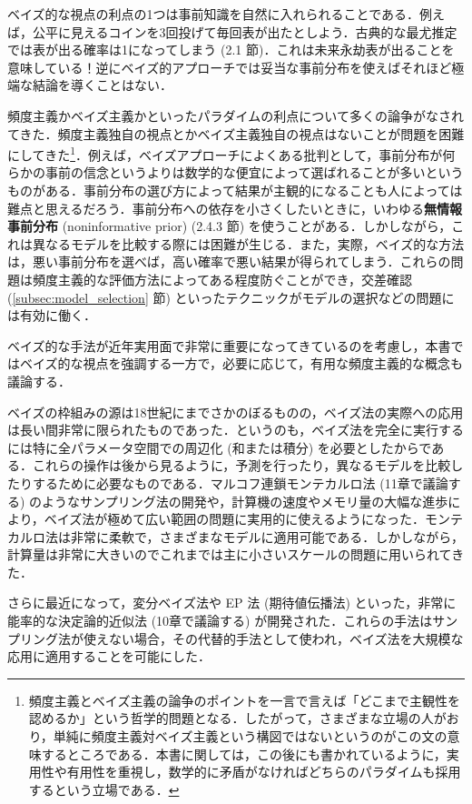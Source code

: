 \documentclass[uplatex,a4paper,oneside,openany,dvipdfmx]{jsarticle}
\numberwithin{equation}{section}
\theoremstyle{mystyle} %
\newcommand{\tb}[1]{\textbf{#1}}
\begin{document}
ベイズ的な視点の利点の1つは事前知識を自然に入れられることである．例えば，公平に見えるコインを3回投げて毎回表が出たとしよう．古典的な最尤推定では表が出る確率は1になってしまう (2.1 節)．これは未来永劫表が出ることを意味している！逆にベイズ的アプローチでは妥当な事前分布を使えばそれほど極端な結論を導くことはない．

頻度主義かベイズ主義かといったパラダイムの利点について多くの論争がなされてきた．頻度主義独自の視点とかベイズ主義独自の視点はないことが問題を困難にしてきた\footnote{頻度主義とベイズ主義の論争のポイントを一言で言えば「どこまで主観性を認めるか」という哲学的問題となる．したがって，さまざまな立場の人がおり，単純に頻度主義対ベイズ主義という構図ではないというのがこの文の意味するところである．本書に関しては，この後にも書かれているように，実用性や有用性を重視し，数学的に矛盾がなければどちらのパラダイムも採用するという立場である．}．例えば，ベイズアプローチによくある批判として，事前分布が何らかの事前の信念というよりは数学的な便宜によって選ばれることが多いというものがある．事前分布の選び方によって結果が主観的になることも人によっては難点と思えるだろう．事前分布への依存を小さくしたいときに，いわゆる\tb{無情報事前分布} (noninformative prior) (2.4.3 節) を使うことがある．しかしながら，これは異なるモデルを比較する際には困難が生じる．また，実際，ベイズ的な方法は，悪い事前分布を選べば，高い確率で悪い結果が得られてしまう．これらの問題は頻度主義的な評価方法によってある程度防ぐことができ，交差確認 (\ref{subsec:model_selection} 節) といったテクニックがモデルの選択などの問題には有効に働く．

ベイズ的な手法が近年実用面で非常に重要になってきているのを考慮し，本書ではベイズ的な視点を強調する一方で，必要に応じて，有用な頻度主義的な概念も議論する．

ベイズの枠組みの源は18世紀にまでさかのぼるものの，ベイズ法の実際への応用は長い間非常に限られたものであった．というのも，ベイズ法を完全に実行するには特に全パラメータ空間での周辺化 (和または積分) を必要としたからである．これらの操作は後から見るように，予測を行ったり，異なるモデルを比較したりするために必要なものである．マルコフ連鎖モンテカルロ法 (11章で議論する) のようなサンプリング法の開発や，計算機の速度やメモリ量の大幅な進歩により，ベイズ法が極めて広い範囲の問題に実用的に使えるようになった．モンテカルロ法は非常に柔軟で，さまざまなモデルに適用可能である．しかしながら，計算量は非常に大きいのでこれまでは主に小さいスケールの問題に用いられてきた．

さらに最近になって，変分ベイズ法や EP 法 (期待値伝播法) といった，非常に能率的な決定論的近似法 (10章で議論する) が開発された．これらの手法はサンプリング法が使えない場合，その代替的手法として使われ，ベイズ法を大規模な応用に適用することを可能にした．
\end{document}
